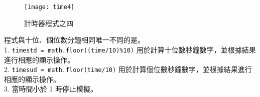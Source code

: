 \begin{figure}[hbt!]
\begin{center}
\texttt{[image: time4]}
\caption{\Large 計時器程式之四}\label{計時器程式之四}
\end{center}
\end{figure} 
程式與十位、個位數分鐘相同唯一不同的是。\\
1. \texttt{timestd = math.floor((time/10)\%10)} 用於計算十位數秒鐘數字，並根據結果進行相應的顯示操作。\\
2. \texttt{timesud = math.floor(time/10)} 用於計算個位數秒鐘數字，並根據結果進行相應的顯示操作。\\
3. 當時間小於 1 時停止模擬。\\
\newpage

\renewcommand{\baselinestretch}{1.0} %